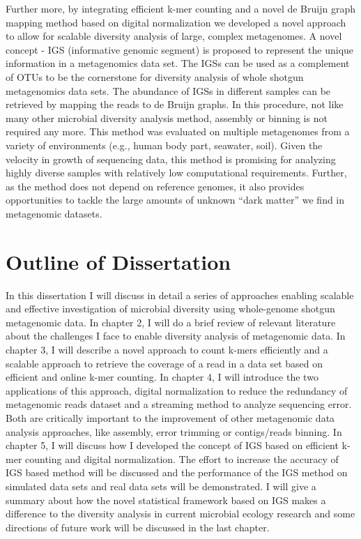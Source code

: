              Further    more, by integrating efficient k-mer counting and a
             novel de Bruijn graph mapping method based on digital
             normalization we developed a novel approach to allow for scalable
             diversity analysis of large, complex metagenomes.  A novel concept
             - IGS (informative genomic segment) is proposed to represent the
             unique information in a metagenomics data set. The IGSs can be
             used as a complement of OTUs to be the cornerstone for diversity
             analysis of whole shotgun metagenomics data sets. The abundance of
             IGSs in different samples can be retrieved by mapping the reads to
             de Bruijn graphs. In this procedure, not like many other microbial
             diversity analysis method, assembly or binning is not required any
             more. This method was evaluated on multiple metagenomes from a
             variety of environments (e.g., human body part, seawater, soil).
             Given the velocity in growth of sequencing data, this method is 
             promising for analyzing highly diverse samples with relatively low
             computational requirements. Further, as the method does not depend
             on reference genomes, it also provides opportunities to tackle the
             large amounts of unknown ``dark matter'' we 
             find in metagenomic datasets.


\section{Outline of Dissertation}

In this dissertation
I will discuss in detail a series of approaches enabling scalable
and effective investigation of microbial diversity using whole-genome shotgun
metagenomic data. In chapter 2, I will do a brief review of relevant
 literature about the challenges
I face to enable diversity analysis of metagenomic data. In chapter 3, I will 
describe a novel approach to count k-mers
efficiently and a scalable approach to retrieve the coverage of a read in a 
data set based on efficient and online k-mer counting. In chapter 4, I will  introduce 
the two applications of this approach, digital normalization to reduce the redundancy of metagenomic reads
dataset and a streaming method to analyze sequencing error. Both are critically important to 
the improvement of
other metagenomic data analysis approaches, like
assembly, error trimming or contigs/reads binning. In chapter 5, I will discuss
how I developed the concept 
of IGS based on efficient k-mer counting and digital normalization.  
The effort to increase the accuracy of IGS based method 
will be discussed and the performance of the IGS method on simulated data sets and
real data sets will be demonstrated. 
I will give a summary about how the novel statistical framework based on IGS makes
 a difference to the diversity analysis in current microbial ecology research and 
 some directions of future work will be discussed in the last chapter.



